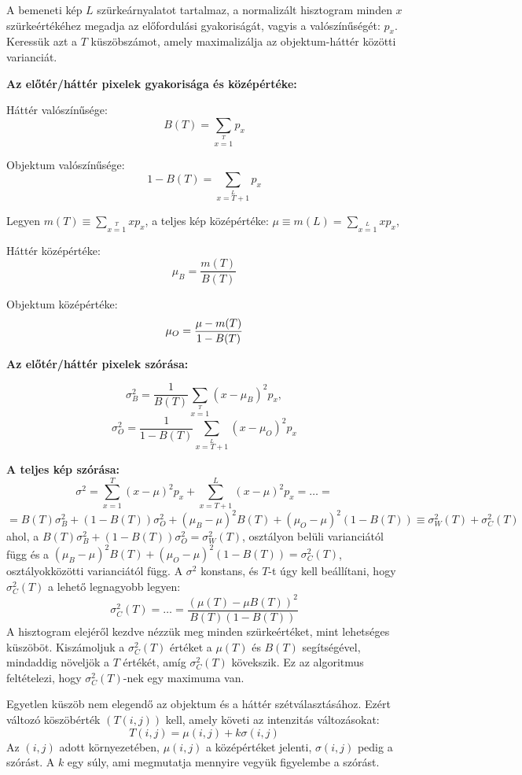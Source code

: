 

A bemeneti kép $L$ szürkeárnyalatot tartalmaz, a normalizált hisztogram minden $x$ szürkeértékéhez megadja az előfordulási gyakoriságát, vagyis a valószínűségét: $p_x$. Keressük azt a $T$ küszöbszámot, amely maximalizálja az objektum-háttér közötti varianciát.

\textbf{Az előtér/háttér pixelek gyakorisága és középértéke:}

Háttér valószínűsége:
$$
B(T) = \sum\limits_{x=1}\limits^{T}p_x 
$$

Objektum valószínűsége:
$$
1-B(T)=\sum\limits_{x=T+1}\limits^{L}p_x
$$

Legyen $m(T)\equiv \sum\limits_{x=1}\limits^{T}xp_x$, a teljes kép középértéke: $\mu \equiv m(L) = \sum\limits_{x=1}\limits^{L}xp_x$,

Háttér középértéke:
$$
\mu_B =\frac{m(T)}{B(T)}
$$

Objektum középértéke:
$$
\mu_O =\frac{\mu-m(T)}{1-B(T)}\\
$$

\textbf{Az előtér/háttér pixelek szórása:}

$$
\sigma^2_B =
\frac{1}{B(T)}\sum\limits_{x=1}\limits^{T}(x-\mu_B)^2 p_x,
$$
$$
\sigma^2_O =
\frac{1}{1-B(T)}\sum\limits_{x=T+1}\limits^{L}(x-\mu_O)^2 p_x
$$

\textbf{A teljes kép szórása:}
$$
\sigma^2 =
\sum_{x=1}^T(x-\mu)^2 p_x + \sum_{x=T+1}^L(x-\mu)^2 p_x =
\dots =
$$
$$
= B(T)\sigma_B^2+(1-B(T))\sigma_O^2 + (\mu_B-\mu)^2B(T)+(\mu_O-\mu)^2(1-B(T)) \equiv \sigma^2_W(T)+\sigma^2_C(T)
$$
ahol, a $B(T)\sigma_B^2+(1-B(T))\sigma_O^2 = \sigma^2_W(T)$, osztályon belüli varianciától függ és a $(\mu_B-\mu)^2B(T)+(\mu_O-\mu)^2(1-B(T)) = \sigma^2_C(T)$, osztályokközötti varianciától függ. A $\sigma^2$ konstans, és $T$-t úgy kell beállítani, hogy $\sigma_C^2(T)$ a lehető legnagyobb legyen:
$$
\sigma^2_C(T) = \dots = \frac{(\mu(T)-\mu B(T))^2}{B(T)(1-B(T))}
$$
A hisztogram elejéről kezdve nézzük meg minden szürkeértéket, mint lehetséges küszöböt. Kiszámoljuk a $\sigma^2_C(T)$ értéket a $\mu(T)$ és $B(T)$  segítségével, mindaddig növeljök a $T$ értékét, amíg $\sigma^2_C(T)$ kövekszik. Ez az algoritmus feltételezi, hogy $\sigma^2_C(T)$-nek egy maximuma van.



Egyetlen küszöb nem elegendő az objektum és a háttér szétválasztásához. Ezért változó köszöbérték $(T(i,j))$ kell, amely követi az intenzitás változásokat:
$$
T(i,j)=\mu(i, j) + k \sigma(i, j)
$$
Az $(i,j)$ adott környezetében, $\mu(i,j)$ a középértéket jelenti, $\sigma(i, j)$ pedig a szórást. A $k$ egy súly, ami megmutatja mennyire vegyük figyelembe a szórást.

